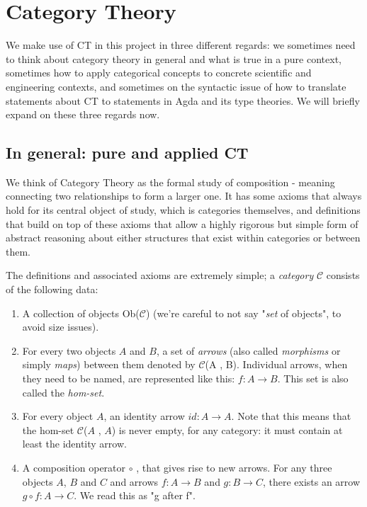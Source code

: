 

\section{Category Theory}

We make use of CT in this project in three different regards: we sometimes need to think about category theory in general and what is true in a pure context, sometimes how to apply categorical concepts to concrete scientific and engineering contexts, and sometimes on the syntactic issue of how to translate statements about CT to statements in Agda and its type theories. We will briefly expand on these three regards now.

\subsection{In general: pure and applied CT}

We think of Category Theory as the formal study of composition - meaning connecting two relationships to form a larger one. It has some axioms that always hold for its central object of study, which is categories themselves, and definitions that build on top of these axioms that allow a highly rigorous but simple form of abstract reasoning about either structures that exist within categories or between them. 

The definitions and associated axioms are extremely simple; a \textit{category} $\mathcal{C}$ consists of the following data:

\begin{enumerate}
  \item A collection of objects Ob($\mathcal{C}$) (we're careful to not say "\textit{set} of objects", to avoid size issues).
  \item For every two objects $A$ and $B$, a set of \textit{arrows} (also called \textit{morphisms} or simply \textit{maps}) between them denoted by $\mathcal{C}$(A , B). Individual arrows, when they need to be named, are represented like this: $f : A \rightarrow B $. This set is also called the \textit{hom-set}.
  \item For every object $A$, an identity arrow $id : A \rightarrow A$. Note that this means that the hom-set $\mathcal{C}$($A$ , $A$) is never empty, for any category: it must contain at least the identity arrow.
  \item A composition operator $ \circ $ , that gives rise to new arrows. For any three objects $A$, $B$ and $C$ and arrows $f : A \rightarrow B $ and $g : B \rightarrow C $, there exists an arrow $g \circ f : A \rightarrow C $. We read this as "g after f".
  
\end{enumerate}

